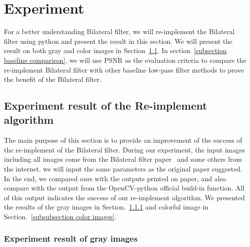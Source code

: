 \documentclass[12pt]{article}
\begin{document}




\clearpage
\section{Experiment}
\label{section Experiment}

For a better understanding Bilateral filter, we will re-implement the Bilateral filter using python and present the result in this section.
We will present the result on both gray and color images in Section~\ref{subsection reimplement}.
In section~\ref{subsection baseline comparison}, we will use PSNR as the evaluation criteria to compare the re-implement Bilateral filter with other baseline low-pass filter methods to prove the benefit of the Bilateral filter.


\subsection{Experiment result of the Re-implement algorithm}
\label{subsection reimplement}
The main purpose of this section is to provide an improvement of the success of the re-implement of the Bilateral filter.
During our experiment, the input images including all images come from the Bilateral filter paper~\cite{paper_bf} and some others from the internet. 
we will input the same parameters as the original paper suggested. 
In the end, we compared ours with the outputs printed on paper, and also compare with the output from the OpenCV-python official build-in function. 
All of this output indicates the success of our re-implement algorithm. 
We presented the results of the gray images in Section.~\ref{subsubsection test gray} and colorful image in Section.~\ref{subsubsection color images}.


\subsubsection{Experiment result of gray images}
\label{subsubsection test gray}
\end{document}
